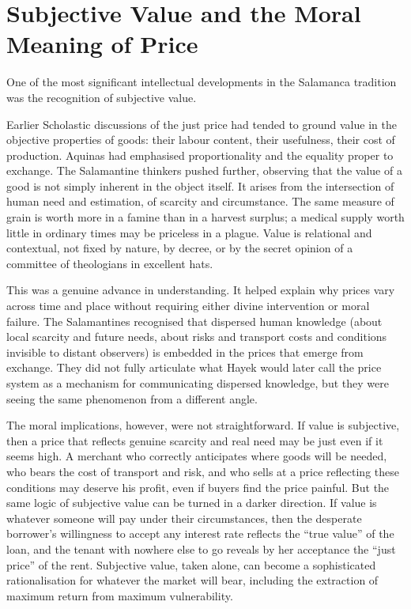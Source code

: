 \documentclass[11pt,a4paper,oneside]{book}
\begin{document}
\section*{Subjective Value and the Moral Meaning of Price}

One of the most significant intellectual developments in the Salamanca tradition was the recognition of subjective value.

Earlier Scholastic discussions of the just price had tended to ground value in the objective properties of goods: their labour content, their usefulness, their cost of production. Aquinas had emphasised proportionality and the equality proper to exchange. The Salamantine thinkers pushed further, observing that the value of a good is not simply inherent in the object itself. It arises from the intersection of human need and estimation, of scarcity and circumstance. The same measure of grain is worth more in a famine than in a harvest surplus; a medical supply worth little in ordinary times may be priceless in a plague. Value is relational and contextual, not fixed by nature, by decree, or by the secret opinion of a committee of theologians in excellent hats.

This was a genuine advance in understanding. It helped explain why prices vary across time and place without requiring either divine intervention or moral failure. The Salamantines recognised that dispersed human knowledge (about local scarcity and future needs, about risks and transport costs and conditions invisible to distant observers) is embedded in the prices that emerge from exchange. They did not fully articulate what Hayek would later call the price system as a mechanism for communicating dispersed knowledge, but they were seeing the same phenomenon from a different angle.

The moral implications, however, were not straightforward. If value is subjective, then a price that reflects genuine scarcity and real need may be just even if it seems high. A merchant who correctly anticipates where goods will be needed, who bears the cost of transport and risk, and who sells at a price reflecting these conditions may deserve his profit, even if buyers find the price painful. But the same logic of subjective value can be turned in a darker direction. If value is whatever someone will pay under their circumstances, then the desperate borrower's willingness to accept any interest rate reflects the ``true value'' of the loan, and the tenant with nowhere else to go reveals by her acceptance the ``just price'' of the rent. Subjective value, taken alone, can become a sophisticated rationalisation for whatever the market will bear, including the extraction of maximum return from maximum vulnerability.
\end{document}
